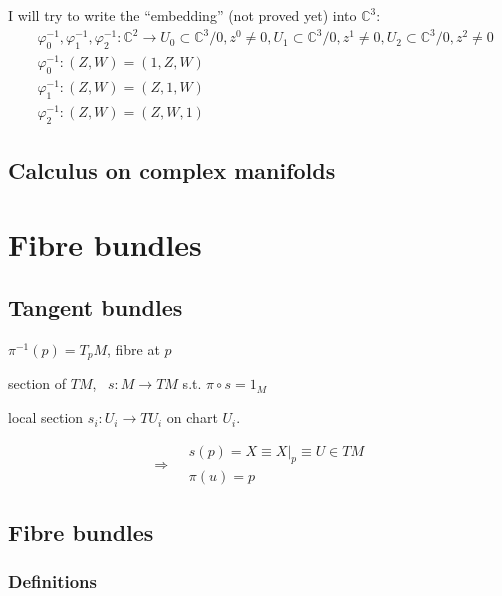 \documentclass[twoside]{amsart}
\begin{document}
I will try to write the ``embedding'' (not proved yet) into $\mathbb{C}^3$:
\[
\begin{aligned}
  & \varphi_0^{-1}, \varphi_1^{-1}, \varphi_2^{-1} : \mathbb{C}^2 \to U_0 \subset \mathbb{C}^3/0, z^0 \neq 0 ,  U_1 \subset \mathbb{C}^3/0, z^1 \neq 0, U_2 \subset \mathbb{C}^3/0, z^2 \neq 0 \\
  & \varphi_0^{-1}:(Z,W) = (1,Z,W) \\ 
  & \varphi_1^{-1}:(Z,W) = (Z,1,W) \\ 
  & \varphi_2^{-1}:(Z,W) = (Z,W,1) 
\end{aligned}
\]





\subsection{ Calculus on complex manifolds }



\section{Fibre bundles}

\subsection{ Tangent bundles }

$\pi^{-1}(p) = T_p M$, fibre at $p$

section of $TM$, \, $s: M \to TM$ s.t. $\pi \circ s = 1_M$

local section $s_i : U_i \to TU_i$ on chart $U_i$.  

\[
\Longrightarrow \begin{aligned} &  s(p) = X \equiv \left. X \right|_p \equiv U \in TM \\
 & \pi(u) = p \end{aligned}
\]





\subsection{ Fibre bundles }


\subsubsection{ Definitions}
\end{document}

